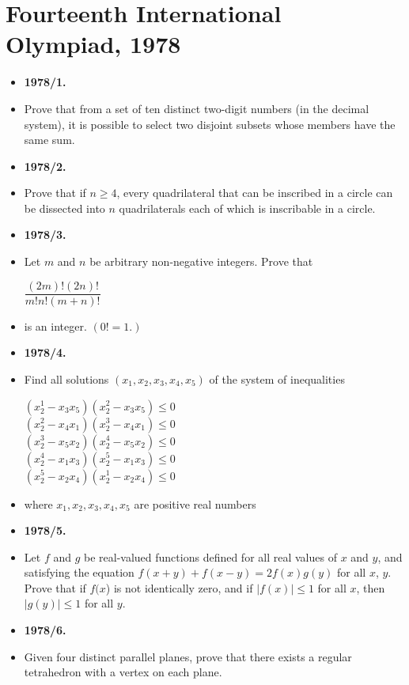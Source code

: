 \documentclass[a4paper,12pt]{article}
\begin{document}
\section*{\textbf{\Large Fourteenth International Olympiad, 1978}}
\begin{itemize}[label={},leftmargin=0pt]
	 \item \textbf{\large 1978/1.}
	 \item Prove that from a set of ten distinct two-digit numbers (in the decimal system), it is possible to select two disjoint subsets whose members have the same sum.
	 \item \textbf{\large 1978/2.}
	 \item Prove that if $n \geq 4$, every quadrilateral that can be inscribed in a circle can be dissected into $n$ quadrilaterals each of which is inscribable in a circle.
	 \item \textbf{\large 1978/3.}
	 \item Let $m$ and $n$ be arbitrary non-negative integers. Prove that
	\begin{center}	 
		$\dfrac{(2m)!(2n)!}{m!n!(m + n)!}$
	\end{center}
	\item is an integer. $(0! = 1.)$
	\item \textbf{\large 1978/4.}
	\item Find all solutions $(x_1, x_2, x_3, x_4, x_5)$ of the system of inequalities
	\begin{center}
$(x_2^1 - x_3 x_5)(x_2^2 - x_3 x_5)  \leq  0$ \\
$(x_2^2 - x_4 x_1)(x_2^3 - x_4 x_1)  \leq  0$ \\
$(x_2^3 - x_5 x_2)(x_2^4 - x_5 x_2)  \leq  0 $ \\
$(x_2^4 - x_1 x_3)(x_2^5 - x_1 x_3)  \leq  0 $ \\
$(x_2^5 - x_2 x_4)(x_2^1 - x_2 x_4)  \leq  0 $

	\end{center}
\item where $x_1, x_2, x_3, x_4, x_5 $ are positive real numbers
\item \textbf{\large 1978/5.}
\item Let $f$ and $g$ be real-valued functions defined for all real values of $x$ and $y$, and satisfying the equation
$f(x + y) + f(x - y) = 2f(x)g(y)$
for all $x$, $y$. Prove that if $f(x$) is not identically zero, and if $|f(x)| \leq 1$ for all $x$, then $|g(y)| \leq 1$ for all $y$.
\item \textbf{\large 1978/6.}
\item Given four distinct parallel planes, prove that there exists a regular tetrahedron with a vertex on each plane.
\end{itemize}
\newpage
\end{document}
